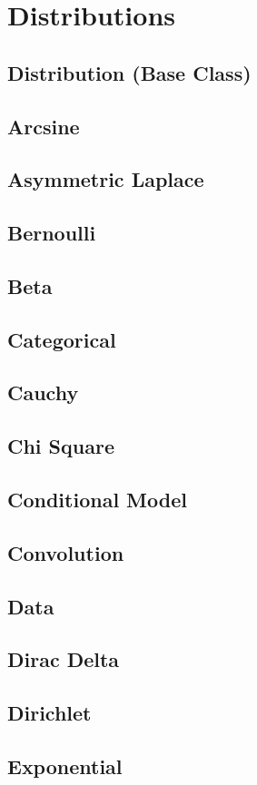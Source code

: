 \section{Distributions}
\subsection{Distribution (Base Class)}
\subsection{Arcsine}
\subsection{Asymmetric Laplace}
\subsection{Bernoulli}
\subsection{Beta}
\subsection{Categorical}
\subsection{Cauchy}
\subsection{Chi Square}
\subsection{Conditional Model}
\subsection{Convolution}
\subsection{Data}
\subsection{Dirac Delta}
\subsection{Dirichlet}
\subsection{Exponential}
